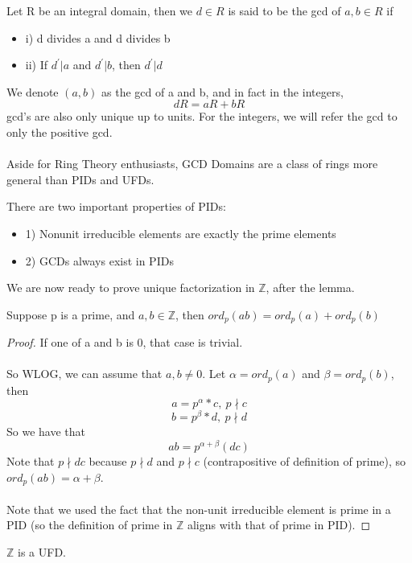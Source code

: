 \begin{definition}
Let R be an integral domain, then we $d \in R$ is said to be the gcd of $a, b \in R$ if
\begin{itemize}
    \item i) d divides a and d divides b
    \item ii) If $d^\prime | a$ and $d^\prime | b$, then $d^\prime | d$
\end{itemize}
We denote $(a, b)$ as the gcd of a and b, and in fact in the integers,
\[dR = aR + bR\]
gcd's are also only unique up to units. For the integers, we will refer the gcd to only the positive gcd.\\\\
Aside for Ring Theory enthusiasts, GCD Domains are a class of rings more general than PIDs and UFDs.
\end{definition}

\noindent There are two important properties of PIDs:
\begin{itemize}
    \item 1) Nonunit irreducible elements are exactly the prime elements
    \item 2) GCDs always exist in PIDs
\end{itemize}

\noindent We are now ready to prove unique factorization in $\mathbb{Z}$, after the lemma.

\begin{lemma}
Suppose p is a prime, and $a, b \in \mathbb{Z}$, then $ord_p(ab) = ord_p(a) + ord_p(b)$
\end{lemma}

\begin{proof}
If one of a and b is 0, that case is trivial.\\\\
So WLOG, we can assume that $a, b \neq 0$. Let $\alpha = ord_p(a)$ and $\beta = ord_p(b)$, then
\[a = p^{\alpha}*c,\ p \nmid c\]
\[b = p^\beta*d,\ p \nmid d\]
So we have that
\[ab = p^{\alpha + \beta}(dc)\]
Note that $p \nmid dc$ because $p \nmid d$ and $p \nmid c$ (contrapositive of definition of prime), so $ord_p(ab) = \alpha + \beta$.\\\\
Note that we used the fact that the non-unit irreducible element is prime in a PID (so the definition of prime in $\mathbb{Z}$ aligns with that of prime in PID).
\end{proof}

\begin{theorem}
$\mathbb{Z}$ is a UFD.
\end{theorem}

